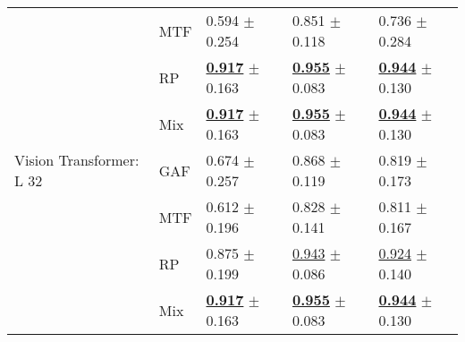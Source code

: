 \begin{tabular}{lllll}
 & MTF & \textcolor[rgb]{0.7344827586,0.2655172414,0}{0.594} $\pm$ \textcolor[rgb]{0.9873545177,0.0126454823,0}{0.254} & \textcolor[rgb]{0.5628672150,0.4371327850,0}{0.851} $\pm$ \textcolor[rgb]{0.4709313066,0.5000000000,0}{0.118} & \textcolor[rgb]{0.8823529412,0.1176470588,0}{0.736} $\pm$ \textcolor[rgb]{1.0000000000,0.0000000000,0}{0.284} \\
 & RP & \underline{\textbf{\textcolor[rgb]{0.0000000000,0.5000000000,0}{0.917}}} $\pm$ \textcolor[rgb]{0.6327066559,0.3672933441,0}{0.163} & \underline{\textbf{\textcolor[rgb]{0.0000000000,0.5000000000,0}{0.955}}} $\pm$ \textcolor[rgb]{0.0919331644,0.5000000000,0}{0.083} & \underline{\textbf{\textcolor[rgb]{0.0000000000,0.5000000000,0}{0.944}}} $\pm$ \textcolor[rgb]{0.0065585724,0.5000000000,0}{0.130} \\
 & Mix & \underline{\textbf{\textcolor[rgb]{0.0000000000,0.5000000000,0}{0.917}}} $\pm$ \textcolor[rgb]{0.6327066559,0.3672933441,0}{0.163} & \underline{\textbf{\textcolor[rgb]{0.0000000000,0.5000000000,0}{0.955}}} $\pm$ \textcolor[rgb]{0.0919331644,0.5000000000,0}{0.083} & \underline{\textbf{\textcolor[rgb]{0.0000000000,0.5000000000,0}{0.944}}} $\pm$ \textcolor[rgb]{0.0065585724,0.5000000000,0}{0.130} \\
Vision Transformer: L 32 & GAF & \textcolor[rgb]{0.5531609195,0.4468390805,0}{0.674} $\pm$ \textcolor[rgb]{1.0000000000,0.0000000000,0}{0.257} & \textcolor[rgb]{0.4696435566,0.5000000000,0}{0.868} $\pm$ \textcolor[rgb]{0.4794730004,0.5000000000,0}{0.119} & \textcolor[rgb]{0.5294117647,0.4705882353,0}{0.819} $\pm$ \textcolor[rgb]{0.2883381018,0.5000000000,0}{0.173} \\
 & MTF & \textcolor[rgb]{0.6922413793,0.3077586207,0}{0.612} $\pm$ \textcolor[rgb]{0.7598126938,0.2401873062,0}{0.196} & \textcolor[rgb]{0.6874265570,0.3125734430,0}{0.828} $\pm$ \textcolor[rgb]{0.7146129022,0.2853870978,0}{0.141} & \textcolor[rgb]{0.5668449198,0.4331550802,0}{0.811} $\pm$ \textcolor[rgb]{0.2469167869,0.5000000000,0}{0.167} \\
 & RP & \textcolor[rgb]{0.0948275862,0.5000000000,0}{0.875} $\pm$ \textcolor[rgb]{0.7749042320,0.2250957680,0}{0.199} & \underline{\textcolor[rgb]{0.0646298472,0.5000000000,0}{0.943}} $\pm$ \textcolor[rgb]{0.1253430190,0.5000000000,0}{0.086} & \underline{\textcolor[rgb]{0.0882352941,0.5000000000,0}{0.924}} $\pm$ \textcolor[rgb]{0.0707312682,0.5000000000,0}{0.140} \\
 & Mix & \underline{\textbf{\textcolor[rgb]{0.0000000000,0.5000000000,0}{0.917}}} $\pm$ \textcolor[rgb]{0.6327066559,0.3672933441,0}{0.163} & \underline{\textbf{\textcolor[rgb]{0.0000000000,0.5000000000,0}{0.955}}} $\pm$ \textcolor[rgb]{0.0919331644,0.5000000000,0}{0.083} & \underline{\textbf{\textcolor[rgb]{0.0000000000,0.5000000000,0}{0.944}}} $\pm$ \textcolor[rgb]{0.0065585724,0.5000000000,0}{0.130} \\
\bottomrule
\end{tabular}

